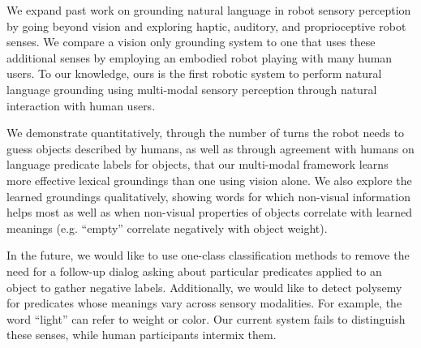 We expand past work on grounding natural language in robot sensory perception by going beyond vision and exploring haptic, auditory, and proprioceptive robot senses.
We compare a vision only grounding system to one that uses these additional senses by employing an embodied robot playing \ispy with many human users.
To our knowledge, ours is the first robotic system to perform natural language grounding using multi-modal sensory perception through natural interaction with human users.

We demonstrate quantitatively, through the number of turns the robot needs to guess objects described by humans, as well as through agreement with humans on language predicate labels for objects, that our multi-modal framework learns more effective lexical groundings than one using vision alone.
We also explore the learned groundings qualitatively, showing words for which non-visual information helps most as well as when non-visual properties of objects correlate with learned meanings (e.g. ``empty'' correlate negatively with object weight).

In the future, we would like to use one-class classification methods to remove the need for a follow-up dialog asking about particular predicates applied to an object to gather negative labels.
Additionally, we would like to detect polysemy for predicates whose meanings vary across sensory modalities.
For example, the word ``light'' can refer to weight or color.
Our current system fails to distinguish these senses, while human participants intermix them.
